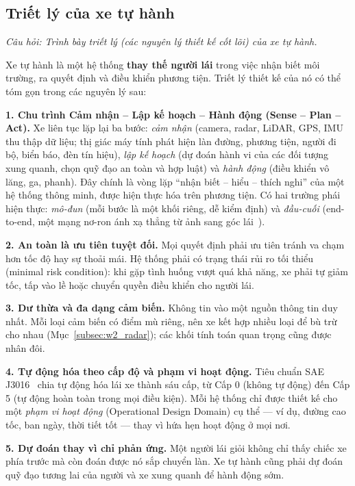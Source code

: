 \subsection{Triết lý của xe tự hành}
\label{subsec:w2_av_philosophy}

\textit{Câu hỏi: Trình bày triết lý (các nguyên lý thiết kế cốt lõi) của xe tự hành.}

Xe tự hành là một hệ thống \textbf{thay thế người lái} trong việc nhận biết môi trường, ra quyết định và điều khiển phương tiện. Triết lý thiết kế của nó có thể tóm gọn trong các nguyên lý sau:

\textbf{1. Chu trình Cảm nhận -- Lập kế hoạch -- Hành động (Sense -- Plan -- Act).} Xe liên tục lặp lại ba bước: \emph{cảm nhận} (camera, radar, LiDAR, GPS, IMU thu thập dữ liệu; thị giác máy tính phát hiện làn đường, phương tiện, người đi bộ, biển báo, đèn tín hiệu), \emph{lập kế hoạch} (dự đoán hành vi của các đối tượng xung quanh, chọn quỹ đạo an toàn và hợp luật) và \emph{hành động} (điều khiển vô lăng, ga, phanh). Đây chính là vòng lặp ``nhận biết -- hiểu -- thích nghi'' của một hệ thống thông minh, được hiện thực hóa trên phương tiện. Có hai trường phái hiện thực: \emph{mô-đun} (mỗi bước là một khối riêng, dễ kiểm định) và \emph{đầu-cuối} (end-to-end, một mạng nơ-ron ánh xạ thẳng từ ảnh sang góc lái~\citep{bojarski2016end}).

\textbf{2. An toàn là ưu tiên tuyệt đối.} Mọi quyết định phải ưu tiên tránh va chạm hơn tốc độ hay sự thoải mái. Hệ thống phải có trạng thái rủi ro tối thiểu (minimal risk condition): khi gặp tình huống vượt quá khả năng, xe phải tự giảm tốc, tấp vào lề hoặc chuyển quyền điều khiển cho người lái.

\textbf{3. Dư thừa và đa dạng cảm biến.} Không tin vào một nguồn thông tin duy nhất. Mỗi loại cảm biến có điểm mù riêng, nên xe kết hợp nhiều loại để bù trừ cho nhau (Mục~\ref{subsec:w2_radar}); các khối tính toán quan trọng cũng được nhân đôi.

\textbf{4. Tự động hóa theo cấp độ và phạm vi hoạt động.} Tiêu chuẩn SAE J3016~\citep{sae2021j3016} chia tự động hóa lái xe thành sáu cấp, từ Cấp 0 (không tự động) đến Cấp 5 (tự động hoàn toàn trong mọi điều kiện). Mỗi hệ thống chỉ được thiết kế cho một \emph{phạm vi hoạt động} (Operational Design Domain) cụ thể — ví dụ, đường cao tốc, ban ngày, thời tiết tốt — thay vì hứa hẹn hoạt động ở mọi nơi.

\textbf{5. Dự đoán thay vì chỉ phản ứng.} Một người lái giỏi không chỉ thấy chiếc xe phía trước mà còn đoán được nó sắp chuyển làn. Xe tự hành cũng phải dự đoán quỹ đạo tương lai của người và xe xung quanh để hành động sớm.

